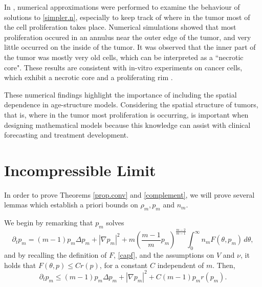 \documentclass{amsart}
\begin{document}
In \cite{llmw}, numerical approximations were performed to examine the behaviour of solutions to \eqref{simpler.n}, especially to keep track of where in the tumor most of the cell proliferation takes place. Numerical simulations showed that most proliferation occured in an annulus near the outer edge of the tumor, and very little occurred on the inside of the tumor. It was observed that the inner part of the tumor was mostly very old cells, which can be interpreted as a ``necrotic core". These results are consistent with in-vitro experiments on cancer cells, which exhibit a necrotic core and a proliferating rim \cite{byrne,thom,noble,lewin}. 

These numerical findings highlight the importance of including the spatial dependence in age-structure models. Considering the spatial structure of tumors, that is, where in the tumor most
proliferation is occurring, is important when designing mathematical models because this knowledge can assist
with clinical forecasting and treatment development.
\section{Incompressible Limit}\label{sec:incomp}

In order to prove Theorems \ref{prop.conv} and \ref{complement}, we will prove several lemmas which establish a priori bounds on $\rho_m,p_m$ and $n_m$.

We begin by remarking that $p_m$ solves  \begin{equation}\label{p.eq}
        \partial_t p_m=(m-1)p_m\Delta p_m+|\nabla p_m|^2+m(\frac{m-1}{m}p_m)^{\frac{m-2}{m-1}}\int_{0}^{\infty}n_mF(\theta,p_m)\, d\theta,
    \end{equation}
    and by recalling the definition of $F$, \eqref{capf}, and the assumptions on $V$ and $\nu$, it holds that $F(\theta,p)\leq Cr(p)$, for a constant $C$ independent of $m$. Then,
    \begin{equation}\label{p.eqbd}
     \partial_t p_m\leq (m-1)p_m\Delta p_m+|\nabla p_m|^2+C(m-1)p_mr(p_m).
    \end{equation}
 
\end{document}
